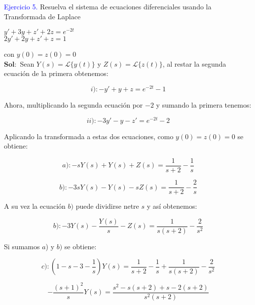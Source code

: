 \textcolor{blue}{Ejercicio 5.} Resuelva el sistema de ecuaciones diferenciales usando la Transformada de Laplace

\begin{center}
    $y'+3y+z'+2z= e^{-2t}$\\
    
    $2y'+2y+z'+z=1$
\end{center}
    
con $y(0)=z(0)=0$\\

$\mathbf{Sol:}$ Sean $Y(s)=  \mathcal{L}\{y(t)\}$ y $Z(s)= \mathcal{L}\{z(t)\}$, al restar la segunda ecuación de la primera obtenemos:

\begin{equation*}
    i): -y'+y+z= e ^{-2t}-1
\end{equation*}

Ahora, multiplicando la segunda ecuación por $-2$ y sumando la primera tenemos: 

\begin{equation*}
    ii): -3y'-y-z'= e^{-2t}-2
\end{equation*}

Aplicando la transformada a estas dos ecuaciones, como $y(0)=z(0)=0$ se obtiene: 

\begin{equation*}
    a): -sY(s)+Y(s)+Z(s)=  \frac{1}{s+2}- \frac{1}{s}
\end{equation*}

\begin{equation*}
    b): -3sY(s)- Y(s)-sZ(s)= \frac{1}{s+2}- \frac{2}{s}
\end{equation*}

A su vez la ecuación $b) $ puede dividirse netre $s$ y así obtenemos: 

\begin{equation*}
     b): -3Y(s)- \frac{Y(s)}{s} - Z(s)= \frac{1}{s(s+2)}- \frac{2}{s^{2}}
\end{equation*}

Si sumamos $a$) y $b)$ se obtiene: 

\begin{equation*}
    c): (1-s-3- \frac{1}{s})Y(s)= \frac{1}{s+2} - \frac{1}{s}+ \frac{1}{s(s+2)}- \frac{2}{s^2}
\end{equation*}

\begin{equation*}
    -\frac{(s+1)^2}{s} Y(s)= \frac{s^2 -s(s+2)+ s-2(s+2)}{s^2(s+2)}
\end{equation*}  

